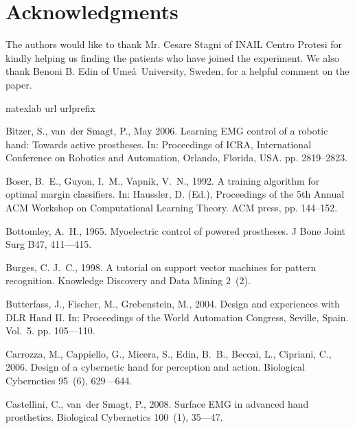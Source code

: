 \documentclass[review,authoryear]{elsarticle}
\begin{document}
\section*{Acknowledgments}

The authors would like to thank Mr. Cesare Stagni of INAIL Centro
Protesi for kindly helping us finding the patients who have joined the
experiment. We also thank Benoni B. Edin of Ume\aa\ University,
Sweden, for a helpful comment on the paper.

\begin{thebibliography}{43}
\expandafter\ifx\csname natexlab\endcsname\relax\def\natexlab#1{#1}\fi
\expandafter\ifx\csname url\endcsname\relax
  \def\url#1{\texttt{#1}}\fi
\expandafter\ifx\csname urlprefix\endcsname\relax\def\urlprefix{URL }\fi

Bitzer, S., van~der Smagt, P., May 2006. Learning {EMG} control of a robotic
  hand: Towards active prostheses. In: Proceedings of ICRA, International
  Conference on Robotics and Automation, Orlando, Florida, USA. pp. 2819--2823.

Boser, B.~E., Guyon, I.~M., Vapnik, V.~N., 1992. A training algorithm for
  optimal margin classifiers. In: Haussler, D. (Ed.), Proceedings of the 5th
  Annual ACM Workshop on Computational Learning Theory. ACM press, pp.
  144--152.

Bottomley, A.~H., 1965. Myoelectric control of powered prostheses. J Bone Joint
  Surg B47, 411---415.

Burges, C. J.~C., 1998. A tutorial on support vector machines for pattern
  recognition. Knowledge Discovery and Data Mining 2~(2).

Butterfass, J., Fischer, M., Grebenstein, M., 2004. Design and experiences with
  {DLR} {Hand} {II}. In: Proceedings of the World Automation Congress, Seville,
  Spain. Vol.~5. pp. 105---110.

Carrozza, M., Cappiello, G., Micera, S., Edin, B.~B., Beccai, L., Cipriani, C.,
  2006. Design of a cybernetic hand for perception and action. Biological
  Cybernetics 95~(6), 629---644.

Castellini, C., van~der Smagt, P., 2008. Surface {EMG} in advanced hand
  prosthetics. Biological Cybernetics 100~(1), 35---47.


\end{thebibliography}
\end{document}

